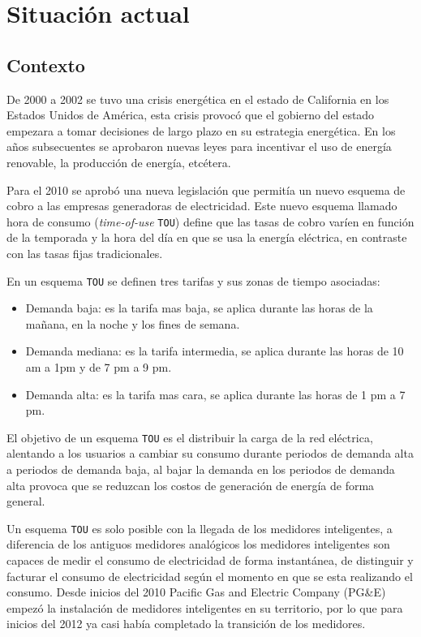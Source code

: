 \chapter{Situación actual}

\section{Contexto}
De 2000 a 2002 se tuvo una crisis energética en el estado de California en los
Estados Unidos de América, esta crisis provocó que el gobierno del estado empezara a
tomar decisiones de largo plazo en su estrategia energética. En los años
subsecuentes se aprobaron nuevas leyes para incentivar el uso de energía renovable,
la producción de energía, etcétera.

Para el 2010 se aprobó una nueva legislación que permitía un nuevo esquema
de cobro a las empresas generadoras de electricidad. Este nuevo esquema
llamado hora de consumo (\textit{time-of-use} \texttt{TOU}) define que las
tasas de cobro varíen en función de la temporada y la hora del día en que
se usa la energía eléctrica, en contraste con las tasas fijas tradicionales.

En un esquema \texttt{TOU} se definen tres tarifas y sus zonas de tiempo asociadas:

\begin{itemize}
\item  Demanda baja: es la tarifa mas baja, se aplica durante las horas de la
  mañana, en la noche y los fines de semana.
\item Demanda mediana: es la tarifa intermedia, se aplica durante las horas de
  10 am a 1pm y de 7 pm a 9 pm.
\item Demanda alta: es la tarifa mas cara, se aplica durante las horas de
  1 pm a 7 pm.
\end{itemize}

El objetivo de un esquema \texttt{TOU} es el distribuir la carga de la red
eléctrica, alentando a los usuarios a cambiar su consumo durante periodos
de demanda alta a periodos de demanda baja, al bajar la demanda en los periodos
de demanda alta provoca que se reduzcan los costos de generación de energía de
forma general.

Un esquema \texttt{TOU} es solo posible con la llegada de los medidores
inteligentes, a diferencia de los antiguos medidores analógicos los medidores
inteligentes son capaces de medir el consumo de electricidad de forma instantánea,
de distinguir y facturar el consumo de electricidad según el momento en que se
esta realizando el consumo. Desde inicios del 2010 Pacific Gas and
Electric Company (PG\&E) empezó la instalación de medidores inteligentes
en su territorio, por lo que para inicios del 2012 ya casi había
completado la transición de los medidores.

